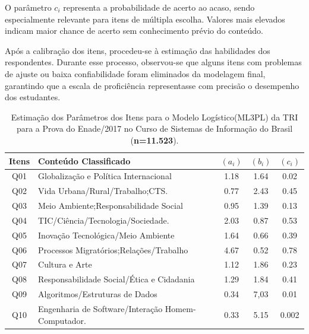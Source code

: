 \documentclass[12pt]{article}
\begin{document}
O parâmetro $c_{i}$ representa a probabilidade de acerto ao acaso, sendo especialmente relevante para itens de múltipla escolha. Valores mais elevados indicam maior chance de acerto sem conhecimento prévio do conteúdo.

Após a calibração dos itens, procedeu-se à estimação das habilidades dos respondentes. Durante esse processo, observou-se que alguns itens com problemas de ajuste ou baixa confiabilidade foram eliminados da modelagem final, garantindo que a escala de proficiência representasse com precisão o desempenho dos estudantes.



\begin{table}[htbp]
	\centering
	\caption{Estimação dos Parâmetros dos Itens para o Modelo Logístico(ML3PL) da TRI para a Prova do Enade/2017 no Curso de Sistemas de Informação do Brasil (\textbf{n=11.523}).}
\begin{tabular}{c|l|c|c|c}
\hline\hline 
  Itens     &  Conteúdo Classificado                               &  $(a_{i})$  & $(b_{i})$ & $(c_{i})$ \\
\hline\hline
  Q01       &  Globalização e Política Internacional               &  1.18       &   1.64    &  0.02     \\
  Q02       &  Vida Urbana/Rural/Trabalho;CTS.                     &  0.77       &   2.43    &  0.45     \\
  Q03       &  Meio Ambiente;Responsabilidade Social               &  0.95       &   1.39    &  0.13     \\
  Q04       &  TIC/Ciência/Tecnologia/Sociedade.                   &  2.03       &   0.87    &  0.53     \\
  Q05       & Inovação Tecnológica/Meio Ambiente                   &  1.64       &   0.66    &  0.39      \\
  Q06       & Processos Migratórios;Relações/Trabalho              &  4.67       &   0.52    &  0.78     \\
  Q07       & Cultura e Arte                                       &  1.12       &   1.86    &  0.23      \\
  Q08       & Responsabilidade Social/Ética e Cidadania            &  1.29       &   1.84    &  0.41     \\
  Q09       & Algoritmos/Estruturas de Dados                       &  0.34       &  7,03    &  0.01     \\
  Q10       & Engenharia de Software/Interação Homem-Computador.   &  0.33       &  5.15     &  0.002     \\

\end{tabular}
\end{table}
\end{document}
